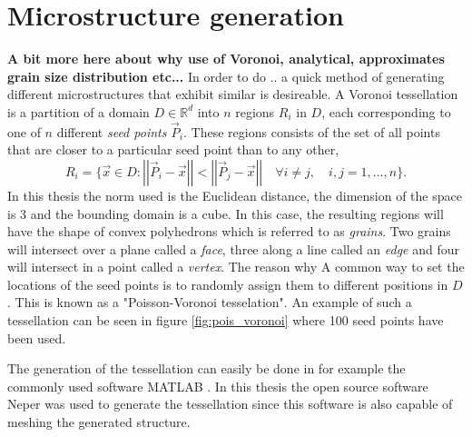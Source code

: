 \documentclass[micro_gen.tex]{subfiles}
\begin{document}
\chapter{Microstructure generation}

\textbf{A bit more here about why use of Voronoi, analytical, approximates grain size distribution etc...}
In order to do .. a quick method of generating different microstructures that exhibit similar is desireable. 
A Voronoi tessellation is a partition of a domain $D \in \mathbb{R}^d$ into $n$ regions $R_i$ in $D$, each corresponding to one of $n$ different \textit{seed points} $\vec{P}_i$. These regions consists of the set of all points that are closer to a particular seed point than to any other,
%
\[R_i = \{ \vec{x} \in D : \left|\left| \vec{P}_i - \vec{x} \right|\right| < \left|\left| \vec{P}_j - \vec{x} \right|\right| \quad  \forall i \neq j, \quad i,j = 1, \ldots, n \}. \]
%
In this thesis the norm used is the Euclidean distance, the dimension of the space is 3 and the bounding domain is a cube. In this case, the resulting regions will have the shape of convex polyhedrons which is referred to as \textit{grains}. Two grains will intersect over a plane called a \textit{face},
three along a line called an \textit{edge} and four will intersect in a point called a \textit{vertex}. The reason why  A common way to set the locations
of the seed points is to randomly assign them to different positions in $D$. 
This is known as a "Poisson-Voronoi tesselation". An example of such a tessellation can be seen in figure \ref{fig:pois_voronoi} where 100 seed points have been used.

The generation of the tessellation can easily be done in for example the commonly used software MATLAB \cite{matlab:voronoi}. In this thesis the open source software Neper \cite{Quey20111729} was used to generate the tessellation since this software is also capable of meshing the generated structure. 
\end{document}
